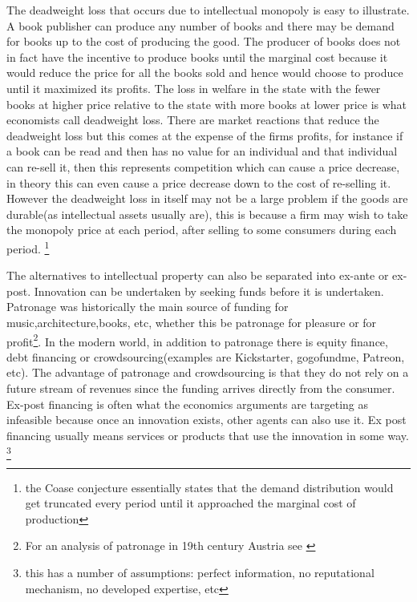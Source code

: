 \documentclass[12pt]{article}
\numberwithin{equation}{section}
\begin{document}
The deadweight loss that occurs due to intellectual monopoly is easy to illustrate. A book publisher can produce any number of books and there may be demand for books up to the cost of producing the good. The producer of books does not in fact have the incentive to produce books until the marginal cost because it would reduce the price for all the books sold and hence would choose to produce until it maximized its profits. The loss in welfare in the state with the fewer books at higher price relative to the state with more books at lower price is what economists call deadweight loss. There are market reactions that reduce the deadweight loss but this comes at the expense of the firms profits, for instance if a book can be read and then has no value for an individual and that individual can re-sell it, then this represents competition which can cause a price decrease, in theory this can even cause a price decrease down to the cost of re-selling it. However the deadweight loss in itself may not be a large problem if the goods are durable(as intellectual assets usually are), this is because a firm may wish to take the monopoly price at each period, after selling to some consumers during each period. \footnote{the Coase conjecture essentially states that the demand distribution would get truncated every period until it approached the marginal cost of production}%

The alternatives to intellectual property can also be separated into ex-ante or ex-post. Innovation can be undertaken by seeking funds before it is undertaken. Patronage was historically the main source of funding for music,architecture,books, etc, whether this be patronage for pleasure or for profit\footnote{For an analysis of patronage in 19th century Austria see \cite{carletti2013top} }. In the modern world, in addition to patronage there is equity finance, debt financing or crowdsourcing(examples are Kickstarter, gogofundme, Patreon, etc). The advantage of patronage and crowdsourcing is that they do not rely on a future stream of revenues since the funding arrives directly from the consumer. Ex-post financing is often what the economics arguments are targeting as infeasible because once an innovation exists, other agents can also use it. Ex post financing usually means services or products that use the innovation in some way. \footnote{ this has a number of assumptions: perfect information, no reputational mechanism, no developed expertise, etc }

\end{document}
